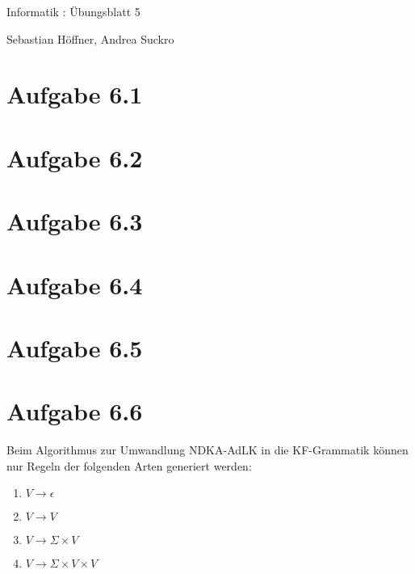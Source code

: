 \documentclass{article}
\begin{document}
\begin{center}
  \Large{Informatik \revD: Übungsblatt 5}

  \large{Sebastian Höffner, Andrea Suckro}
\end{center}



\section*{Aufgabe 6.1}
%




\section*{Aufgabe 6.2}



\section*{Aufgabe 6.3}



\section*{Aufgabe 6.4}



\section*{Aufgabe 6.5}



\section*{Aufgabe 6.6}
Beim Algorithmus zur Umwandlung NDKA-AdLK in die KF-Grammatik können nur Regeln der folgenden Arten generiert werden:
\begin{enumerate}
	\item $V \rightarrow \epsilon$
  \item $V \rightarrow V$
  \item $V \rightarrow \Sigma \times V$
  \item $V \rightarrow \Sigma \times V \times V$
\end{enumerate}
\end{document}
